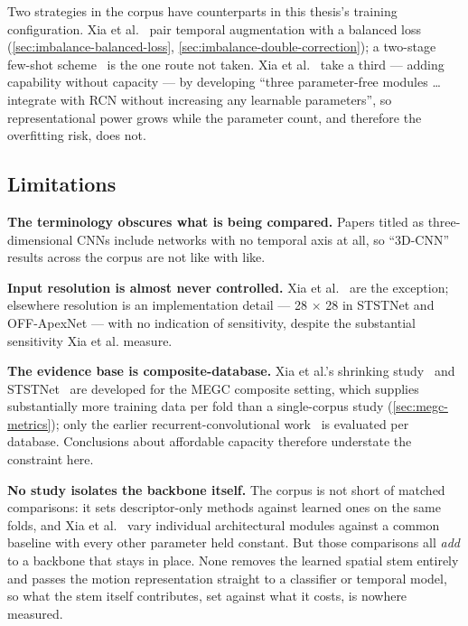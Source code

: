 Two strategies in the corpus have counterparts in this thesis's training configuration. Xia et al.~\cite{xia2020a} pair temporal augmentation with a balanced loss (\autoref{sec:imbalance-balanced-loss}, \autoref{sec:imbalance-double-correction}); a two-stage few-shot scheme~\cite{zhaoS2021} is the one route not taken. Xia et al.~\cite{xia2020b} take a third --- adding capability without capacity --- by developing ``three parameter-free modules \ldots integrate with RCN without increasing any learnable parameters'', so representational power grows while the parameter count, and therefore the overfitting risk, does not.

\subsection{Limitations}
\label{sec:cnn-limitations}

\textbf{The terminology obscures what is being compared.} Papers titled as three-dimensional CNNs include networks with no temporal axis at all, so ``3D-CNN'' results across the corpus are not like with like.

\textbf{Input resolution is almost never controlled.} Xia et al.~\cite{xia2020b} are the exception; elsewhere resolution is an implementation detail --- 28 $\times$ 28 in STSTNet and OFF-ApexNet --- with no indication of sensitivity, despite the substantial sensitivity Xia et al. measure.

\textbf{The evidence base is composite-database.} Xia et al.'s shrinking study~\cite{xia2020b} and STSTNet~\cite{liong2019b} are developed for the MEGC composite setting, which supplies substantially more training data per fold than a single-corpus study (\autoref{sec:megc-metrics}); only the earlier recurrent-convolutional work~\cite{xia2020a} is evaluated per database. Conclusions about affordable capacity therefore understate the constraint here.

\textbf{No study isolates the backbone itself.} The corpus is not short of matched comparisons: it sets descriptor-only methods against learned ones on the same folds, and Xia et al.~\cite{xia2020b} vary individual architectural modules against a common baseline with every other parameter held constant. But those comparisons all \textit{add} to a backbone that stays in place. None removes the learned spatial stem entirely and passes the motion representation straight to a classifier or temporal model, so what the stem itself contributes, set against what it costs, is nowhere measured.

